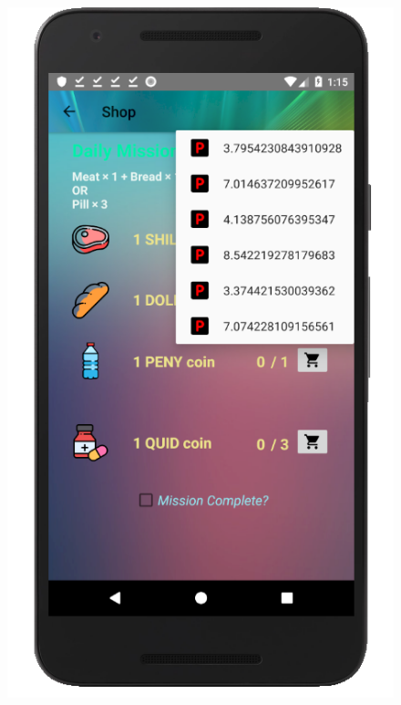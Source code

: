 \documentclass[12pt]{article}
\begin{document}
\begin{figure}
	\includegraphics[scale=0.25]{shopBuy.png}

\end{figure}
\end{document}
